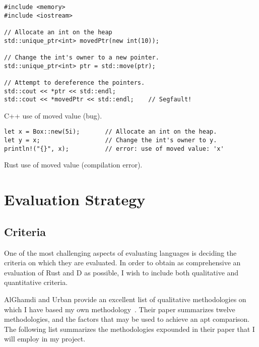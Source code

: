 \documentclass[finalcopy]{srpaper}
\begin{document}
\begin{listing}[h]
\begin{verbatim}
#include <memory>
#include <iostream>

// Allocate an int on the heap
std::unique_ptr<int> movedPtr(new int(10));

// Change the int's owner to a new pointer.
std::unique_ptr<int> ptr = std::move(ptr);

// Attempt to dereference the pointers.
std::cout << *ptr << std::endl;
std::cout << *movedPtr << std::endl;    // Segfault!
\end{verbatim}
\caption{C++ use of moved value (bug).}
\label{lst:cppuseaftermove}
\end{listing}

\begin{listing}[h]
\begin{verbatim}
let x = Box::new(5i);       // Allocate an int on the heap.
let y = x;                  // Change the int's owner to y.
println!("{}", x);          // error: use of moved value: 'x'
\end{verbatim}
\caption{Rust use of moved value (compilation error).}
\label{lst:rustuseaftermove}
\end{listing}

\chapter{Evaluation Strategy}

\section{Criteria}

One of the most challenging aspects of evaluating languages is deciding the
criteria on which they are evaluated. In order to obtain as comprehensive an
evaluation of Rust and D as possible, I wish to include both qualitative and
quantitative criteria.

AlGhamdi and Urban provide an excellent list of qualitative methodologies on
which I have based my own methodology~\cite{AlGhamdi:1993:CAP:162754.162876}.
Their paper summarizes twelve methodologies, and the factors that may be used
to achieve an apt comparison. The following list summarizes the methodologies
expounded in their paper that I will employ in my project.
\end{document}
